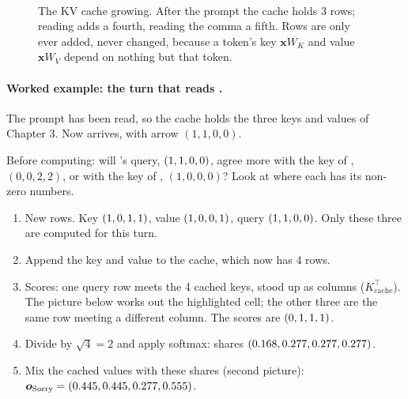\begin{figure}[!tbp]
\centering
\fitR{}\\[8pt]
\fitR{}
\caption{The KV cache growing. After the prompt the cache holds 3 rows; reading  adds a
fourth, reading the comma a fifth. Rows are only ever added, never changed, because a token's key
$\bm{x}W_K$ and value $\bm{x}W_V$ depend on nothing but that token.}
\label{fig:ch9grow}
\end{figure}

\paragraph{Worked example: the turn that reads .} The prompt  has been read, so the
cache holds the three keys and values of Chapter 3. Now  arrives, with arrow $(1,1,0,0)$.

\Predict Before computing: will 's query, $(1, 1, 0, 0)$, agree more with the key of
, $(0,0,2,2)$, or with the key of , $(1,0,0,0)$? Look at where each has its non-zero
numbers.

\begin{enumerate}[label=\arabic*.,leftmargin=1.6em]
\item New rows. Key $(1, 0, 1, 1)$, value $(1, 0, 0, 1)$, query $(1, 1, 0, 0)$. Only these three are computed
for this turn.
\item Append the key and value to the cache, which now has 4 rows.
\item Scores: one query row meets the 4 cached keys, stood up as columns ($K_{\text{cache}}^\top$). The
picture below works out the highlighted cell; the other three are the same row meeting a different column.
The scores are $(0, 1, 1, 1)$.
\item Divide by $\sqrt{4}=2$ and apply softmax: shares $(0.168, 0.277, 0.277, 0.277)$.
\item Mix the cached values with these shares (second picture): $\bm{o}_{\text{Sorry}} = (0.445, 0.445, 0.277, 0.555)$.
\end{enumerate}
\par\medskip\noindent\begin{minipage}{\linewidth}\centering
\fitR{}\\[2pt]
\\[10pt]
\fitR{}\\[2pt]

\end{minipage}\par\medskip

